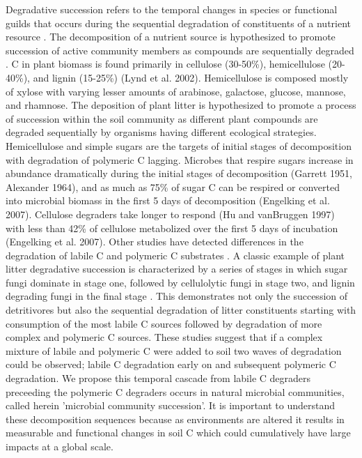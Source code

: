 Degradative succession refers to the temporal changes in species or functional guilds that occurs during the sequential degradation of constituents of a nutrient resource \cite{townsend2003essentials,Bastian_2009}. The decomposition of a nutrient source is hypothesized to promote succession of active community members as compounds are sequentially degraded \cite{Biddanda_1988}. C in plant biomass is found primarily in cellulose (30-50\%), hemicellulose (20-40\%), and lignin (15-25\%) (Lynd et al. 2002). Hemicellulose is composed mostly of xylose with varying lesser amounts of arabinose, galactose, glucose, mannose, and rhamnose. The deposition of plant litter is hypothesized to promote a process of succession within the soil community as different plant compounds are degraded sequentially by organisms having different ecological strategies. Hemicellulose and simple sugars are the targets of initial stages of decomposition with degradation of polymeric C lagging. Microbes that respire sugars increase in abundance dramatically during the initial stages of decomposition (Garrett 1951, Alexander 1964), and as much as 75\% of sugar C can be respired or converted into microbial biomass in the first 5 days of decomposition (Engelking et al. 2007). Cellulose degraders take longer to respond (Hu and vanBruggen 1997) with less than 42\% of cellulose metabolized over the first 5 days of incubation (Engelking et al. 2007). Other studies have detected differences in the degradation of labile C and polymeric C substrates \cite{Engelking_2007,Anderson_1973,Stotzky_1961,Alden_2001,Furukawa_1996,Fontaine_2003,Blagodatskaya_2007,Jenkins_2010,Rui_2009,Fierer_2010}. A classic example of plant litter degradative succession is characterized by a series of stages in which sugar fungi dominate in stage one, followed by cellulolytic fungi in stage two, and lignin degrading fungi in the final stage \cite{Gessner_2010}. This demonstrates not only the succession of detritivores but also the sequential degradation of litter constituents starting with consumption of the most labile C sources followed by degradation of more complex and polymeric C sources. These studies suggest that if a complex mixture of labile and polymeric C were added to soil two waves of degradation could be observed; labile C degradation early on and subsequent polymeric C degradation. We propose this temporal cascade from labile C degraders preceeding the polymeric C degraders occurs in natural microbial communities, called herein 'microbial community succession'. It is important to understand these decomposition sequences because as environments are altered it results in measurable and functional changes in soil C \cite{Grandy_2008} which could cumulatively have large impacts at a global scale.  
